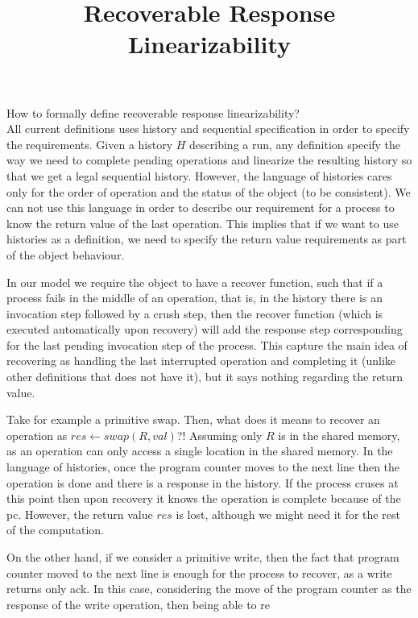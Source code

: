 \documentclass[]{article}
\title{Recoverable Response Linearizability}
\date{}
\begin{document}
\maketitle

How to formally define recoverable response linearizability?
\\ All current definitions uses history and sequential specification in order to specify the requirements. Given a history $H$ describing a run, any definition specify the way we need to complete pending operations and linearize the resulting history so that we get a legal sequential history. However, the language of histories cares only for the order of operation and the status of the object (to be consistent). We can not use this language in order to describe our requirement for a process to know the return value of the last operation. This implies that if we want to use histories as a definition, we need to specify the return value requirements as part of the object behaviour.

In our model we require the object to have a recover function, such that if a process fails in the middle of an operation, that is, in the history there is an invocation step followed by a crush step, then the recover function (which is executed automatically upon recovery) will add the response step corresponding for the last pending invocation step of the process. This capture the main idea of recovering as handling the last interrupted operation and completing it (unlike other definitions that does not have it), but it says nothing regarding the return value.

Take for example a primitive swap. Then, what does it means to recover an operation as $res \leftarrow swap(R,val)$?! Assuming only $R$ is in the shared memory, as an operation can only access a single location in the shared memory. In the language of histories, once the program counter moves to the next line then the operation is done and there is a response in the history. If the process cruses at this point then upon recovery it knows the operation is complete because of the pc. However, the return value $res$ is lost, although we might need it for the rest of the computation.

On the other hand, if we consider a primitive write, then the fact that program counter moved to the next line is enough for the process to recover, as a write returns only ack. In this case, considering the move of the program counter as the response of the write operation, then being able to re
\end{document}
